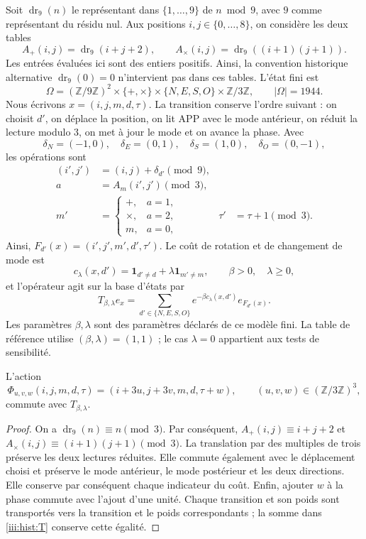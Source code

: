 Soit $\operatorname{dr}_9(n)$ le représentant dans $\{1,\ldots,9\}$ de
$n\bmod9$, avec $9$ comme représentant du résidu nul. Aux positions
$i,j\in\{0,\ldots,8\}$, on considère les deux tables
\[
 A_+(i,j)=\operatorname{dr}_9(i+j+2),\qquad
 A_\times(i,j)=\operatorname{dr}_9((i+1)(j+1)).
\]
Les entrées évaluées ici sont des entiers positifs. Ainsi, la convention
historique alternative $\operatorname{dr}_9(0)=0$ n’intervient pas dans ces tables.
L’état fini est
\[
 \Omega=(\mathbb Z/9\mathbb Z)^2\times\{+,\times\}
 \times\{N,E,S,O\}\times\mathbb Z/3\mathbb Z,
 \qquad |\Omega|=1944.
\]
Nous écrivons $x=(i,j,m,d,\tau)$. La transition conserve l’ordre suivant :
on choisit $d'$, on déplace la position, on lit APP avec le mode antérieur,
on réduit la lecture modulo $3$, on met à jour le mode et on avance la phase.
Avec
\[
 \delta_N=(-1,0),\quad\delta_E=(0,1),\quad
 \delta_S=(1,0),\quad\delta_O=(0,-1),
\]
les opérations sont
\begin{align*}
 (i',j')&=(i,j)+\delta_{d'}\pmod9,\\
 a&=A_m(i',j')\pmod3,\\
 m'&=\begin{cases}+,&a=1,\\\times,&a=2,\\m,&a=0,\end{cases}
 &\tau'&=\tau+1\pmod3.
\end{align*}
Ainsi, $F_{d'}(x)=(i',j',m',d',\tau')$. Le coût de rotation et de changement de mode est
\[
 c_\lambda(x,d')=\mathbf1_{d'\ne d}+\lambda\mathbf1_{m'\ne m},
 \qquad \beta>0,\quad\lambda\geq0,
\]
et l’opérateur agit sur la base d’états par
\begin{equation}
 T_{\beta,\lambda}e_x
 =\sum_{d'\in\{N,E,S,O\}}
 e^{-\beta c_\lambda(x,d')}e_{F_{d'}(x)}.
 \label{iii:hist:T}
\end{equation}
Les paramètres $\beta,\lambda$ sont des paramètres déclarés de ce modèle
fini. La table de référence utilise $(\beta,\lambda)=(1,1)$ ; le cas
$\lambda=0$ appartient aux tests de sensibilité.

\begin{proposition}
\label{iii:hist:equivarianza}
L’action
\[
 \Phi_{u,v,w}(i,j,m,d,\tau)
 =(i+3u,j+3v,m,d,\tau+w),\qquad
 (u,v,w)\in(\mathbb Z/3\mathbb Z)^3,
\]
commute avec $T_{\beta,\lambda}$.
\end{proposition}
\begin{proof}
On a $\operatorname{dr}_9(n)\equiv n\pmod3$. Par conséquent,
$A_+(i,j)\equiv i+j+2$ et
$A_\times(i,j)\equiv(i+1)(j+1)\pmod3$.
La translation par des multiples de trois préserve les deux lectures réduites.
Elle commute également avec le déplacement choisi et préserve le mode antérieur,
le mode postérieur et les deux directions. Elle conserve par conséquent chaque
indicateur du coût. Enfin, ajouter $w$ à la phase commute avec l’ajout d’une
unité. Chaque transition et son poids sont transportés vers la transition et le poids
correspondants ; la somme dans \eqref{iii:hist:T} conserve cette égalité.
\end{proof}

